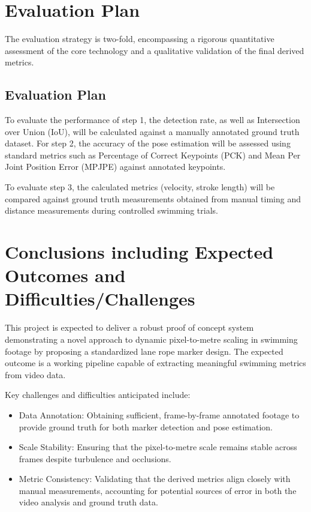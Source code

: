\documentclass[conference]{IEEEtran}
\begin{document}
\section{Evaluation Plan}
The evaluation strategy is two-fold, encompassing a rigorous quantitative assessment of the core technology and a qualitative validation of the final derived metrics.

\subsection{Evaluation Plan}
To evaluate the performance of step 1, the detection rate, as well as Intersection over Union (IoU), will be calculated against a manually annotated ground truth dataset. For step 2, the accuracy of the pose estimation will be assessed using standard metrics such as Percentage of Correct Keypoints (PCK) and Mean Per Joint Position Error (MPJPE) against annotated keypoints.

To evaluate step 3, the calculated metrics (velocity, stroke length) will be compared against ground truth measurements obtained from manual timing and distance measurements during controlled swimming trials.

\section{Conclusions including Expected Outcomes and Difficulties/Challenges}
This project is expected to deliver a robust proof of concept system demonstrating a novel approach to dynamic pixel-to-metre scaling in swimming footage by proposing a standardized lane rope marker design. The expected outcome is a working pipeline capable of extracting meaningful swimming metrics from video data.

Key challenges and difficulties anticipated include:
\begin{itemize}
    \item Data Annotation: Obtaining sufficient, frame-by-frame annotated footage to provide ground truth for both marker detection and pose estimation.
    \item Scale Stability: Ensuring that the pixel-to-metre scale remains stable across frames despite turbulence and occlusions.
    \item Metric Consistency: Validating that the derived metrics align closely with manual measurements, accounting for potential sources of error in both the video analysis and ground truth data.
\end{itemize}
\end{document}
